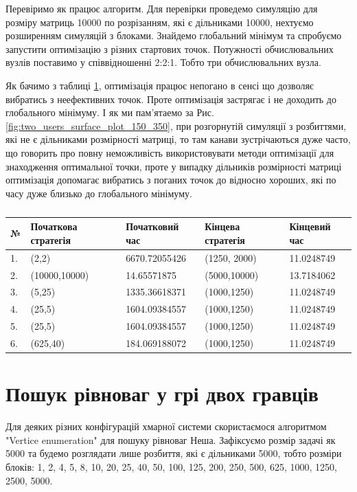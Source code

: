 Перевіримо як працює алгоритм. Для перевірки проведемо симуляцію для розміру матриць 10000 по розрізанням, які є дільниками 10000, нехтуємо розширенням симуляцій з блоками. Знайдемо глобальний мінімум та спробуємо запустити оптимізацію з різних стартових точок. Потужності обчислювальних вузлів поставимо у співвідношенні 2:2:1. Тобто три обчислювальних вузла.

Як бачимо з таблиці \ref{table:optimize_results}, оптимізація працює непогано в сенсі що дозволяє вибратись з неефективних точок. Проте оптимізація застрягає і не доходить до глобального мінімуму. І як ми пам'ятаемо за Рис. \ref{fig:two_users_surface_plot_150_350}, при розгорнутій симуляції з розбиттями, які не є дільниками розмірності матриці, то там канави зустрічаються дуже часто, що говорить про повну неможливість використовувати методи оптимізації для знаходження оптимальної точки, проте у випадку дільників розмірності матриці оптимізація допомагає вибратись з поганих точок до відносно хороших, які по часу дуже близько до глобального мінімуму.

\begin{table}[H]
	\caption{}
	\label{table:optimize_results}
	\begin{tabular}{|l|l|l|l|l|}
		\hline
		№ & Початкова стратегія & Початковий час 	& Кінцева стратегія & Кінцевий час
		\\ \hline
		1.& (2,2)				& 6670.72055426     &  (1250, 2000) 	& 11.0248749
		\\ \hline
		2.& (10000,10000)		& 14.65571875   	&  (5000,10000)		& 13.7184062
		\\ \hline
		3.& (5,25)				& 1335.36618371		&  (1000,1250)		& 11.0248749
		\\ \hline
		4.& (25,5)				& 1604.09384557		&  (1000,1250)		& 11.0248749
		\\ \hline
		5.& (25,5)				& 1604.09384557		&  (1000,1250)		& 11.0248749
		\\ \hline
		6.& (625,40)			& 184.069188072		&  (1000,1250)		& 11.0248749
		\\ \hline
		
	\end{tabular}
\end{table}

\section{Пошук рівноваг у грі двох гравців}

Для деяких різних конфігурацій хмарної системи скористаємося алгоритмом "Vertice enumeration" для пошуку рівноваг Неша. Зафіксуємо розмір задачі як 5000 та будемо розглядати лише розбиття, які є дільниками 5000, тобто розміри блоків: 1, 2, 4, 5, 8, 10, 20, 25, 40, 50,  100, 125, 200, 250, 500, 625, 1000, 1250, 2500, 5000.

